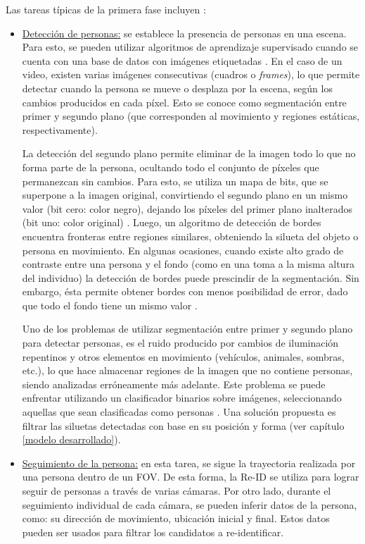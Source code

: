 \documentclass[../memoria.tex]{subfiles}
\begin{document}
Las tareas típicas de la primera fase incluyen \cite{yilmaz2006object}:
\begin{itemize}
	\item \underline{Detección de personas:} se establece la presencia de personas en una escena. Para esto, se pueden utilizar algoritmos de aprendizaje supervisado cuando se cuenta con una base de datos con imágenes etiquetadas \cite{dalal2005histograms}. En el caso de un video, existen varias imágenes consecutivas (cuadros o \emph{frames}), lo que permite detectar cuando la persona se mueve o desplaza por la escena, según los cambios producidos en cada píxel. Esto se conoce como segmentación entre primer y segundo plano (que corresponden al movimiento y regiones estáticas, respectivamente).

	La detección del segundo plano permite eliminar de la imagen todo lo que no forma parte de la persona, ocultando todo el conjunto de píxeles que permanezcan sin cambios. Para esto, se utiliza un mapa de bits, que se superpone a la imagen original, convirtiendo el segundo plano en un mismo valor (bit cero: color negro), dejando los píxeles del primer plano inalterados (bit uno: color original) \cite{bouwmans2008background}. Luego, un algoritmo de detección de bordes \cite{canny1986computational} encuentra fronteras entre regiones similares, obteniendo la silueta del objeto o persona en movimiento. En algunas ocasiones, cuando existe alto grado de contraste entre una persona y el fondo (como en una toma a la misma altura del individuo) la detección de bordes puede prescindir de la segmentación. Sin embargo, ésta permite obtener bordes con menos posibilidad de error, dado que todo el fondo tiene un mismo valor \cite{bouwmans2008background}.

	Uno de los problemas de utilizar segmentación entre primer y segundo plano para detectar personas, es el ruido producido por cambios de iluminación repentinos y otros elementos en movimiento (vehículos, animales, sombras, etc.), lo que hace almacenar regiones de la imagen que no contiene personas, siendo analizadas erróneamente más adelante. Este problema se puede enfrentar utilizando un clasificador binarios sobre imágenes, seleccionando aquellas que sean clasificadas como personas \cite{nakajima2003full}. Una solución propuesta es filtrar las siluetas detectadas con base en su posición y forma (ver capítulo \ref{modelo desarrollado}).

	\item \underline{Seguimiento de la persona:} en esta tarea, se sigue la trayectoria realizada por una persona dentro de un FOV. De esta forma, la Re-ID se utiliza para lograr seguir de personas a través de varias cámaras. Por otro lado, durante el seguimiento individual de cada cámara, se pueden inferir datos de la persona, como: su dirección de movimiento, ubicación inicial y final. Estos datos pueden ser usados para filtrar los candidatos a re-identificar.
	

\end{itemize}
\end{document}
